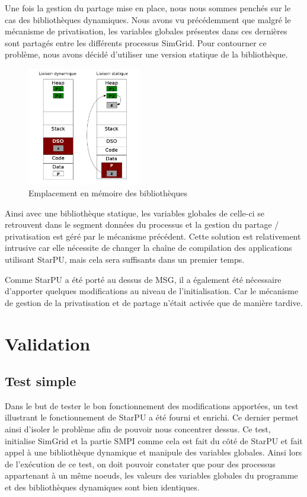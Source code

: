 \documentclass[smallextended]{svjour3}
\begin{document}
Une fois la gestion du partage mise en place, nous nous sommes
penchés sur le cas des bibliothèques dynamiques. Nous avons vu
précédemment que malgré le mécanisme de privatisation, les variables
globales présentes dans ces dernières sont partagés entre les
différents processus SimGrid. Pour contourner ce problème, nous
avons décidé d'utiliser une version statique de la bibliothèque.  

\begin{figure}[htb]
\centering
\includegraphics[width=5cm]{./Img/StaticDyn.jpg}
\caption{\label{fig:3}Emplacement en mémoire des bibliothèques}
\end{figure}

Ainsi avec une bibliothèque statique, les variables globales de
celle-ci se retrouvent dans le segment données du processus et la
gestion du partage / privatisation est géré par le mécanisme
précédent. Cette solution est relativement intrusive car
elle nécessite de changer la chaîne de compilation des applications
utilisant StarPU, mais cela sera suffisants dans un premier temps. 

Comme StarPU a été porté au dessus de MSG, il a également été
nécessaire d'apporter quelques modifications au niveau de
l'initialisation. Car le mécanisme de gestion de la privatisation et
de partage n'était activée que de manière tardive. 

\section{Validation}
\label{sec-6}
\subsection{Test simple}
\label{sec-6-1}
Dans le but de tester le bon fonctionnement des modifications
apportées, un test illustrant le fonctionnement de StarPU a été
fourni et enrichi. Ce dernier permet ainsi d'isoler le problème
afin de pouvoir nous concentrer dessus. Ce test, initialise SimGrid
et la partie SMPI comme cela est fait du côté de StarPU et fait
appel à une bibliothèque dynamique et manipule des variables
globales. Ainsi lors de l'exécution de ce test, on doit pouvoir
constater que pour des processus appartenant à un même noeuds, les
valeurs des variables globales du programme et des bibliothèques
dynamiques sont bien identiques.  
\end{document}
